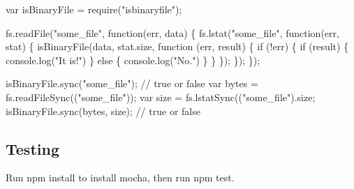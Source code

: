 \begin{DoxyCode}
var isBinaryFile = require("isbinaryfile");

fs.readFile("some\_file", function(err, data) \{
  fs.lstat("some\_file", function(err, stat) \{
    isBinaryFile(data, stat.size, function (err, result) \{
      if (!err) \{
        if (result) \{
          console.log("It is!")
        \}
        else \{
          console.log("No.")
        \}
      \}
    \});
  \});
\});

isBinaryFile.sync("some\_file"); // true or false
var bytes = fs.readFileSync(("some\_file"));
var size = fs.lstatSync(("some\_file").size;
isBinaryFile.sync(bytes, size); // true or false
\end{DoxyCode}


\subsection*{Testing}

Run {\ttfamily npm install} to install {\ttfamily mocha}, then run {\ttfamily npm test}. 